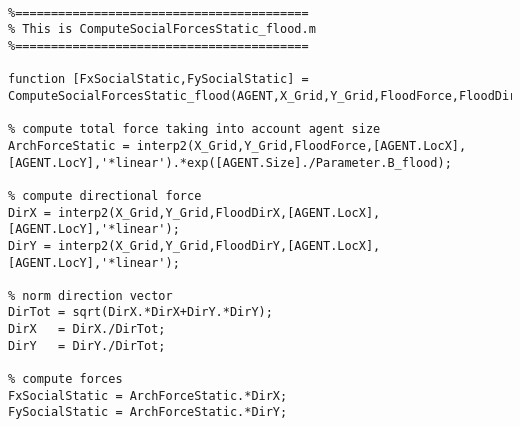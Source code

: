 \lstset{basicstyle=\footnotesize\ttfamily}
    
    \begin{lstlisting}[breaklines]
    
%=========================================
% This is ComputeSocialForcesStatic_flood.m
%=========================================
    
function [FxSocialStatic,FySocialStatic] = ComputeSocialForcesStatic_flood(AGENT,X_Grid,Y_Grid,FloodForce,FloodDirX,FloodDirY,Parameter)

% compute total force taking into account agent size
ArchForceStatic = interp2(X_Grid,Y_Grid,FloodForce,[AGENT.LocX],[AGENT.LocY],'*linear').*exp([AGENT.Size]./Parameter.B_flood);

% compute directional force
DirX = interp2(X_Grid,Y_Grid,FloodDirX,[AGENT.LocX],[AGENT.LocY],'*linear');
DirY = interp2(X_Grid,Y_Grid,FloodDirY,[AGENT.LocX],[AGENT.LocY],'*linear');

% norm direction vector
DirTot = sqrt(DirX.*DirX+DirY.*DirY);
DirX   = DirX./DirTot;
DirY   = DirY./DirTot;

% compute forces
FxSocialStatic = ArchForceStatic.*DirX;
FySocialStatic = ArchForceStatic.*DirY;
\end{lstlisting}